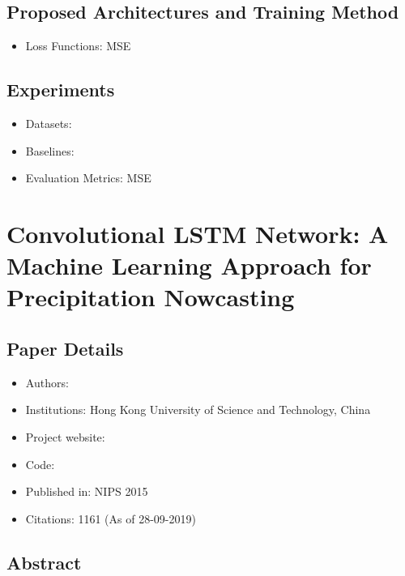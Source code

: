 \documentclass{article}
\begin{document}
    \subsection{Proposed Architectures and Training Method}\label{subsec:Action_Conditional_Video_Prediction_using_Deep_Networks_in_Atari_Games:proposed-architectures}
    \begin{itemize}
        \item Loss Functions: MSE
    \end{itemize}

    \subsection{Experiments}\label{subsec:Action_Conditional_Video_Prediction_using_Deep_Networks_in_Atari_Games:experiments}
    \begin{itemize}
        \item Datasets:
        \item Baselines:
        \item Evaluation Metrics: MSE
    \end{itemize}
    \newpage


    \section{Convolutional LSTM Network: A Machine Learning Approach for Precipitation Nowcasting}\label{sec:Convolutional_LSTM_Network_A_Machine_Learning_Approach_for_Precipitation_Nowcasting}
    \subsection*{Paper Details}
    \begin{itemize}
        \item Authors:
        \item Institutions: Hong Kong University of Science and Technology, China
        \item Project website:
        \item Code:
        \item Published in: NIPS 2015
        \item Citations: 1161 (As of 28-09-2019)
    \end{itemize}

    \subsection*{Abstract}
\end{document}
